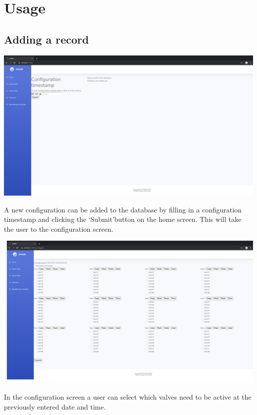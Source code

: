 \documentclass[12pt]{article}
\begin{document}
\section{Usage}
\subsection{Adding a record}
\begin{center}
	\includegraphics[width=\linewidth]{images/Home_screen_no_data.png}
\end{center}
A new configuration can be added to the database by filling in a configuration timestamp and clicking the \lq Submit\rq button on the home screen. This will take the user to the configuration screen.\\
\begin{center}
	\includegraphics[width=\linewidth]{images/Empty_config_screen.png}
\end{center}
In the configuration screen a user can select which valves need to be active at the previously entered date and time.\\
\end{document}

